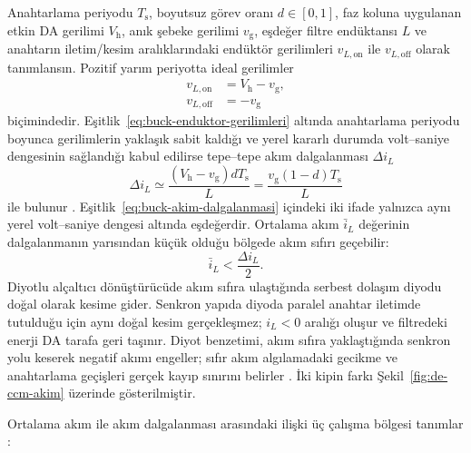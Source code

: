 Anahtarlama periyodu $T_{\mathrm{s}}$, boyutsuz görev oranı $d\in[0,1]$, faz koluna uygulanan etkin DA gerilimi $V_{\mathrm{h}}$, anık şebeke gerilimi $v_{\mathrm{g}}$, eşdeğer filtre endüktansı $L$ ve anahtarın iletim/kesim aralıklarındaki endüktör gerilimleri $v_{L,\mathrm{on}}$ ile $v_{L,\mathrm{off}}$ olarak tanımlansın. Pozitif yarım periyotta ideal gerilimler
\begin{equation}
  \begin{aligned}
    v_{L,\mathrm{on}} &= V_{\mathrm{h}}-v_{\mathrm{g}}, \\
    v_{L,\mathrm{off}} &= -v_{\mathrm{g}}
  \end{aligned}
  \label{eq:buck-enduktor-gerilimleri}
\end{equation}
biçimindedir. Eşitlik~\eqref{eq:buck-enduktor-gerilimleri} altında anahtarlama periyodu boyunca gerilimlerin yaklaşık sabit kaldığı ve yerel kararlı durumda volt--saniye dengesinin sağlandığı kabul edilirse tepe--tepe akım dalgalanması $\Delta i_L$
\begin{equation}
  \Delta i_L \simeq \frac{(V_{\mathrm{h}}-v_{\mathrm{g}})dT_{\mathrm{s}}}{L}
  =\frac{v_{\mathrm{g}}(1-d)T_{\mathrm{s}}}{L}
  \label{eq:buck-akim-dalgalanmasi}
\end{equation}
ile bulunur \citep{Erickson2001,Chen2010}. Eşitlik~\eqref{eq:buck-akim-dalgalanmasi} içindeki iki ifade yalnızca aynı yerel volt--saniye dengesi altında eşdeğerdir. Ortalama akım $\bar{i}_L$ değerinin dalgalanmanın yarısından küçük olduğu bölgede akım sıfırı geçebilir:
\begin{equation}
  \bar{i}_L < \frac{\Delta i_L}{2}.
  \label{eq:ters-akim-esigi}
\end{equation}
Diyotlu alçaltıcı dönüştürücüde akım sıfıra ulaştığında serbest dolaşım diyodu doğal olarak kesime gider. Senkron yapıda diyoda paralel anahtar iletimde tutulduğu için aynı doğal kesim gerçekleşmez; $i_L<0$ aralığı oluşur ve filtredeki enerji DA tarafa geri taşınır. Diyot benzetimi, akım sıfıra yaklaştığında senkron yolu keserek negatif akımı engeller; sıfır akım algılamadaki gecikme ve anahtarlama geçişleri gerçek kayıp sınırını belirler \citep{Chen2010,Erickson2001}. İki kipin farkı Şekil~\ref{fig:de-ccm-akim} üzerinde gösterilmiştir.

Ortalama akım ile akım dalgalanması arasındaki ilişki üç çalışma bölgesi tanımlar \citep{Mohan2003,Erickson2001,Holmes2003}:

